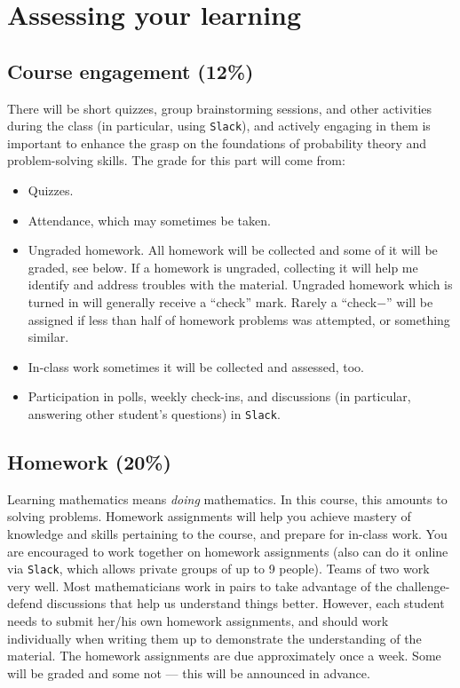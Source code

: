 \documentclass[oneside,11pt]{amsart}
\begin{document}
\newpage

\section{Assessing your learning}

\subsection{Course engagement (12\%)}

There will be short quizzes, group brainstorming sessions, 
and other activities during the class
(in particular, using \texttt{Slack}),
and actively engaging in them is important to enhance 
the grasp on the foundations of probability theory and
problem-solving skills.
The grade for this part will come from: 
\begin{itemize}
	\item Quizzes.
	\item Attendance, which may sometimes be taken.
	\item Ungraded homework. All homework will be collected and some of it will be graded, see below.
	If a homework is ungraded, collecting
	it will help me identify and address 
	troubles with the material. Ungraded homework which is turned in will generally receive a ``check'' mark.
	Rarely a ``check$-$'' will be assigned if less than half of homework
	problems was attempted, or something similar.
	\item In-class work sometimes it will be collected
	and assessed, too.
	\item 
	Participation in
	polls, weekly check-ins, and
	discussions (in particular, answering other student's questions)
	in \texttt{Slack}.
\end{itemize}

\subsection{Homework (20\%)}


Learning mathematics means \emph{doing} mathematics. 
In this course, this amounts to solving problems.
Homework assignments 
will help you achieve mastery of knowledge and skills pertaining to the course,
and prepare for in-class work.
You are encouraged to work together on homework assignments (also can do it online via
\texttt{Slack}, which allows private groups of up to 9 people).
Teams of two work very well. Most mathematicians work in pairs to take advantage of the challenge-defend discussions that help us understand things better.
However, each student needs to submit her/his own homework assignments,
and should work individually when writing them up to demonstrate
the understanding of the material.
The homework assignments are due approximately once a week. Some will be graded and some not ---
this will be announced in advance.
\end{document}
